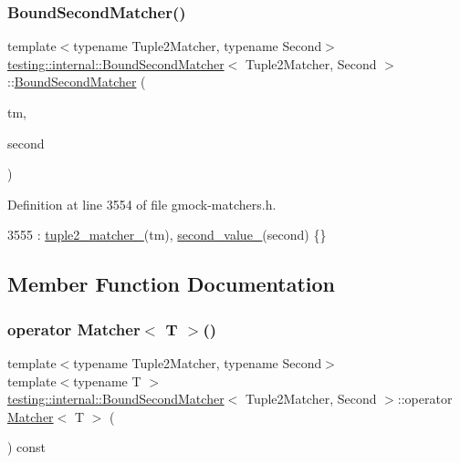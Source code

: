 \subsubsection{\texorpdfstring{Bound\+Second\+Matcher()}{BoundSecondMatcher()}}
{\footnotesize\ttfamily template$<$typename Tuple2\+Matcher, typename Second$>$ \\
\hyperlink{classtesting_1_1internal_1_1BoundSecondMatcher}{testing\+::internal\+::\+Bound\+Second\+Matcher}$<$ Tuple2\+Matcher, Second $>$\+::\hyperlink{classtesting_1_1internal_1_1BoundSecondMatcher}{Bound\+Second\+Matcher} (\begin{DoxyParamCaption}\item[{const Tuple2\+Matcher \&}]{tm,  }\item[{const Second \&}]{second }\end{DoxyParamCaption})\hspace{0.3cm}{\ttfamily [inline]}}



Definition at line 3554 of file gmock-\/matchers.\+h.


\begin{DoxyCode}
3555       : \hyperlink{classtesting_1_1internal_1_1BoundSecondMatcher_a4e73978cc5f6972a37b01832380f099e}{tuple2\_matcher\_}(tm), \hyperlink{classtesting_1_1internal_1_1BoundSecondMatcher_a5b0de81ac5ff6e7d9e21cb8bfeaacaf5}{second\_value\_}(second) \{\}
\end{DoxyCode}


\subsection{Member Function Documentation}
\mbox{\label{classtesting_1_1internal_1_1BoundSecondMatcher_abc5264ca86c2440b663036dcfb5403de}} 
\subsubsection{\texorpdfstring{operator Matcher$<$ T $>$()}{operator Matcher< T >()}}
{\footnotesize\ttfamily template$<$typename Tuple2\+Matcher, typename Second$>$ \\
template$<$typename T $>$ \\
\hyperlink{classtesting_1_1internal_1_1BoundSecondMatcher}{testing\+::internal\+::\+Bound\+Second\+Matcher}$<$ Tuple2\+Matcher, Second $>$\+::operator \hyperlink{classtesting_1_1Matcher}{Matcher}$<$ T $>$ (\begin{DoxyParamCaption}{ }\end{DoxyParamCaption}) const\hspace{0.3cm}{\ttfamily [inline]}}



